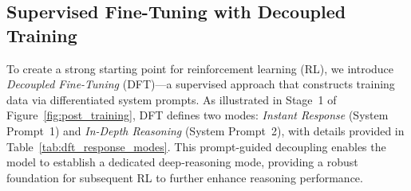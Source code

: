 \documentclass[table]{gtech}
\theoremstyle{definition}
\begin{document}
\subsection{Supervised Fine-Tuning with Decoupled Training}
\label{sft}
To create a strong starting point for reinforcement learning (RL), we introduce \emph{Decoupled Fine-Tuning} (DFT)—a supervised approach that constructs training data via differentiated system prompts. As illustrated in Stage~1 of Figure~\ref{fig:post_training}, DFT defines two modes: \textit{Instant Response} (System Prompt~1) and \textit{In-Depth Reasoning} (System Prompt~2), with details provided in Table~\ref{tab:dft_response_modes}. This prompt-guided decoupling enables the model to establish a dedicated deep‑reasoning mode, providing a robust foundation for subsequent RL to further enhance reasoning performance.

\begin{table}[htbp]
  \centering
  \small
  \vspace{0.5cm}
  \caption{Response modes guided by system prompts in Decoupled Fine-Tuning (DFT).}
  \label{tab:dft_response_modes}
\end{table}
\end{document}
